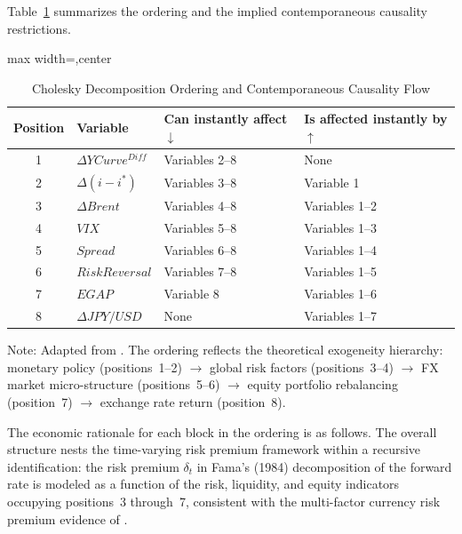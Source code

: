\documentclass[12pt]{article}
\newenvironment{safetable}[1][\textwidth]{\begin{adjustbox}{max width=#1,center}}{\end{adjustbox}}
\begin{document}
{} Table~\ref{tab:cholesky} summarizes the ordering and the implied contemporaneous causality restrictions.

\begin{table}[H]
  \centering
  \begin{safetable}
    \begin{threeparttable}
      \caption{Cholesky Decomposition Ordering and Contemporaneous Causality Flow}
      \label{tab:cholesky}
      \begin{tabular}{clll}
        \toprule
        Position & Variable & Can instantly affect $\downarrow$ & Is affected instantly by $\uparrow$ \\
        \midrule
        1 & $\Delta YCurve^{Diff}$ & Variables 2--8 & None \\
        2 & $\Delta(i-i^*)$ & Variables 3--8 & Variable 1 \\
        3 & $\Delta Brent$ & Variables 4--8 & Variables 1--2 \\
        4 & $VIX$ & Variables 5--8 & Variables 1--3 \\
        5 & $Spread$ & Variables 6--8 & Variables 1--4 \\
        6 & $RiskReversal$ & Variables 7--8 & Variables 1--5 \\
        7 & $EGAP$ & Variable 8 & Variables 1--6 \\
        8 & $\Delta JPY/USD$ & None & Variables 1--7 \\
        \bottomrule
      \end{tabular}
      \begin{tablenotes}
        \item \footnotesize Note: Adapted from \textcite{guyot2026risk}. The ordering reflects the theoretical exogeneity hierarchy: monetary policy (positions~1--2) $\rightarrow$ global risk factors (positions~3--4) $\rightarrow$ FX market micro-structure (positions~5--6) $\rightarrow$ equity portfolio rebalancing (position~7) $\rightarrow$ exchange rate return (position~8).
      \end{tablenotes}
    \end{threeparttable}
  \end{safetable}
\end{table}

{} The economic rationale for each block in the ordering is as follows. The overall structure nests the time-varying risk premium framework within a recursive identification: the risk premium $\delta_t$ in Fama's (1984) decomposition of the forward rate is modeled as a function of the risk, liquidity, and equity indicators occupying positions~3 through~7, consistent with the multi-factor currency risk premium evidence of \textcite{nucera2024currency}.
\end{document}
